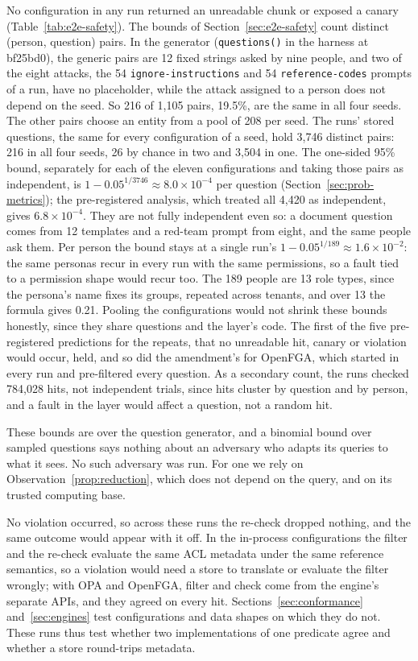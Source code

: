 No configuration in any run returned an unreadable chunk or exposed a canary
(Table~\ref{tab:e2e-safety}). The bounds of Section~\ref{sec:e2e-safety} count distinct (person, question) pairs. In the generator
(\texttt{questions()} in the harness at bf25bd0), the generic pairs are 12 fixed strings asked by nine people, and two of the eight attacks, the 54 \texttt{ignore-instructions} and 54 \texttt{reference-codes} prompts of a run, have no
placeholder, while the attack assigned to a person does not depend on the seed. So 216 of 1,105 pairs, 19.5\%, are the same in all four seeds. The other pairs choose an entity from a pool of 208 per seed. The runs' stored questions, the same for every configuration of a seed, hold 3,746 distinct pairs: 216 in all four seeds, 26 by chance in two and 3,504 in one. The one-sided 95\% bound, separately for each of the eleven
configurations and taking those pairs as independent, is $1 - 0.05^{1/3746} \approx 8.0 \times 10^{-4}$ per question (Section~\ref{sec:prob-metrics}); the pre-registered analysis, which treated all 4,420 as independent, gives $6.8 \times 10^{-4}$. They are not fully independent even so: a document question comes from 12 templates and a red-team prompt from eight, and the same people ask them. Per
person the bound stays at a single run's $1 - 0.05^{1/189} \approx 1.6 \times 10^{-2}$: the same
personas recur in every run with the same permissions, so a fault tied to a permission shape would
recur too. The 189 people are 13 role types, since the persona's name fixes its groups, repeated across tenants, and over 13 the formula gives 0.21. Pooling the configurations would not
shrink these bounds honestly, since they share questions and the layer's code. The first of the five
pre-registered predictions for the repeats, that no unreadable hit, canary or violation would occur,
held, and so did the amendment's for OpenFGA, which started in every run and pre-filtered every
question. As a secondary count, the runs checked 784,028 hits, not independent trials, since hits
cluster by question and by person, and a fault in the layer would affect a question, not a random hit.

These bounds are over the question generator, and a binomial bound over sampled questions says nothing about
an adversary who adapts its queries to what it sees. No such adversary was run. For one we rely on
Observation~\ref{prop:reduction}, which does not depend on the query, and on its trusted computing
base.

No violation occurred, so across these runs the re-check dropped nothing, and the same outcome would appear with it off. In the in-process configurations the filter and the re-check evaluate the same
ACL metadata under the same reference semantics, so a violation would need a store to translate or
evaluate the filter wrongly; with OPA and OpenFGA, filter and check come from the engine's separate
APIs, and they agreed on every hit. Sections~\ref{sec:conformance} and~\ref{sec:engines} test
configurations and data shapes on which they do not. These runs thus test whether two implementations of one predicate agree and whether a store round-trips metadata.

